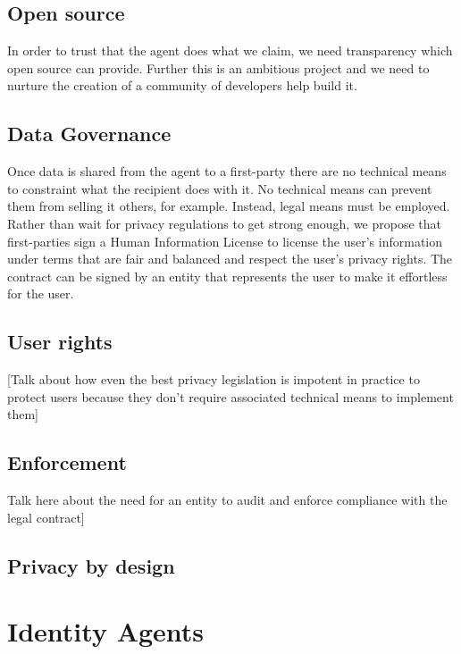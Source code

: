 \documentclass[11pt, oneside]{article}   	%
\begin{document}
\subsection{Open source}

In order to trust that the agent does what we claim, we need transparency which open source can provide. Further this is an ambitious project and we need to nurture the creation of a community of developers help build it.

\subsection{Data Governance}

Once data is shared from the agent to a first-party there are no technical means to constraint what the recipient does with it. No technical means can prevent them from selling it others, for example. Instead, legal means must be employed. Rather than wait for privacy regulations to get strong enough, we propose that first-parties sign a Human Information License to license the user's information under terms that are fair and balanced and respect the user's privacy rights. The contract can be signed by an entity that represents the user to make it effortless for the user.

\subsection{User rights}

[Talk about how even the best privacy legislation is impotent in practice to protect users because they don't require associated technical means to implement them]

\subsection{Enforcement}

Talk here about the need for an entity to audit and enforce compliance with the legal contract]

\subsection{Privacy by design}

\section{Identity Agents} %
\end{document}
